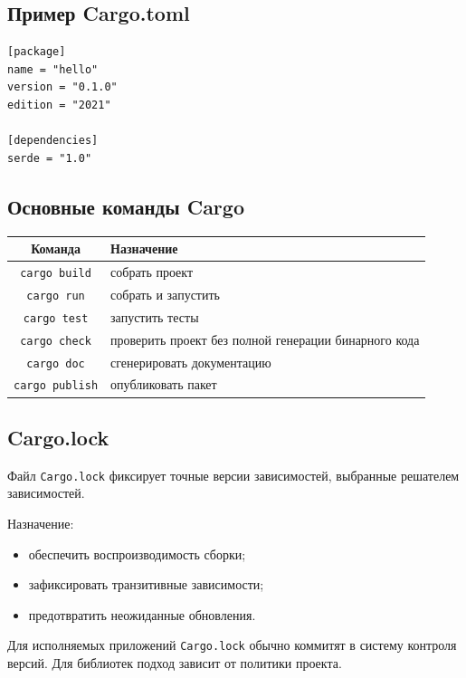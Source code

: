 \documentclass[12pt,a4paper]{article}
\begin{document}
\subsection{Пример Cargo.toml}

\begin{lstlisting}
[package]
name = "hello"
version = "0.1.0"
edition = "2021"

[dependencies]
serde = "1.0"
\end{lstlisting}

\subsection{Основные команды Cargo}

\begin{center}
\begin{tabular}{|c|p{9cm}|}
\hline
Команда & Назначение \\
\hline
\texttt{cargo build} & собрать проект \\
\hline
\texttt{cargo run} & собрать и запустить \\
\hline
\texttt{cargo test} & запустить тесты \\
\hline
\texttt{cargo check} & проверить проект без полной генерации бинарного кода \\
\hline
\texttt{cargo doc} & сгенерировать документацию \\
\hline
\texttt{cargo publish} & опубликовать пакет \\
\hline
\end{tabular}
\end{center}

\subsection{Cargo.lock}

Файл \texttt{Cargo.lock} фиксирует точные версии зависимостей, выбранные решателем зависимостей.

Назначение:
\begin{itemize}
    \item обеспечить воспроизводимость сборки;
    \item зафиксировать транзитивные зависимости;
    \item предотвратить неожиданные обновления.
\end{itemize}

Для исполняемых приложений \texttt{Cargo.lock} обычно коммитят в систему контроля версий. Для библиотек подход зависит от политики проекта.
\end{document}
